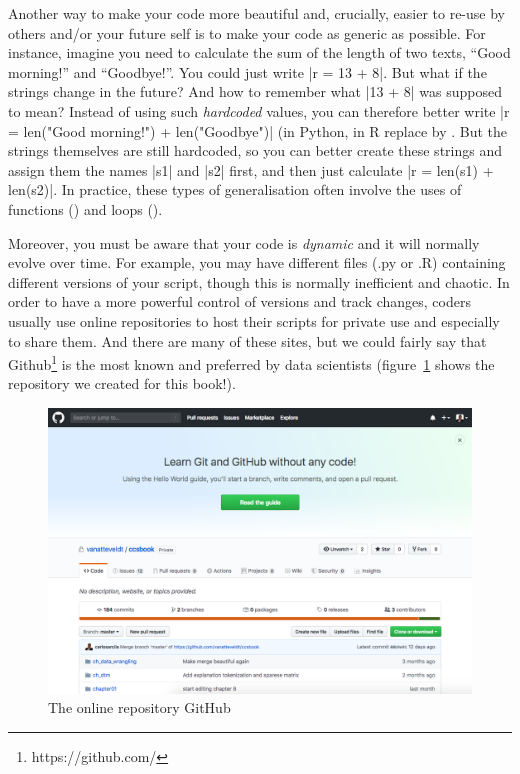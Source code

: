 Another way to make your code more beautiful and, crucially, easier to re-use by others and/or your future self is to make your code as generic as possible. For instance, imagine you need to calculate the sum of the length of two texts, ``Good morning!'' and ``Goodbye!''. You could just write |r = 13 + 8|. But what if the strings change in the future? And how to remember what |13 + 8| was supposed to mean? Instead of using such \emph{hardcoded} values, you can therefore better write |r = len("Good morning!") + len("Goodbye")| (in Python, in R replace  by . But the strings themselves are still hardcoded, so you can better create these strings and assign them the names |s1| and |s2| first, and then just calculate |r = len(s1) + len(s2)|. In practice, these types of generalisation often involve the uses of functions () and loops ().

Moreover, you must be aware that your code is \textit{dynamic} and it will normally evolve over time. For example, you may have different files (.py or .R) containing different versions of your script, though this is normally inefficient and chaotic. In order to have a more powerful control of versions and track changes, coders usually use online repositories to host their scripts for private use and especially to share them. And there are many of these sites, but we could fairly say that Github\footnote{https://github.com/} is the most known and preferred by data scientists (figure~\ref{fig:github} shows the repository we created for this book!).

\begin{figure}
\centering
\includegraphics[width=0.9\linewidth]{figures/ch04_github}
\caption{The online repository GitHub}
\label{fig:github}
\end{figure}
 
